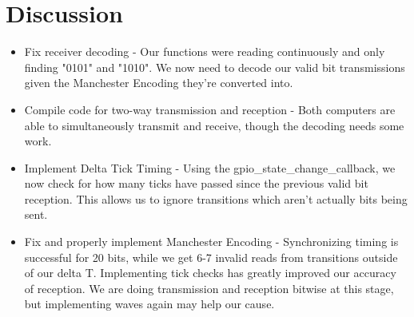 \documentclass{article}
\begin{document}
\section*{Discussion}
\begin{itemize}
\item Fix receiver decoding - Our functions were reading continuously and only finding "0101" and "1010". We now need to decode our valid bit transmissions given the Manchester Encoding they're converted into.

\item Compile code for two-way transmission and reception - Both computers are able to simultaneously transmit and receive, though the decoding needs some work.

\item Implement Delta Tick Timing - Using the gpio\_state\_change\_callback, we now check for how many ticks have passed since the previous valid bit reception. This allows us to ignore transitions which aren't actually bits being sent.
\item Fix and properly implement Manchester Encoding - Synchronizing timing is successful for 20 bits, while we get 6-7 invalid reads from transitions outside of our delta T. Implementing tick checks has greatly improved our accuracy of reception. We are doing transmission and reception bitwise at this stage, but implementing waves again may help our cause.

\end{itemize}
\end{document}
